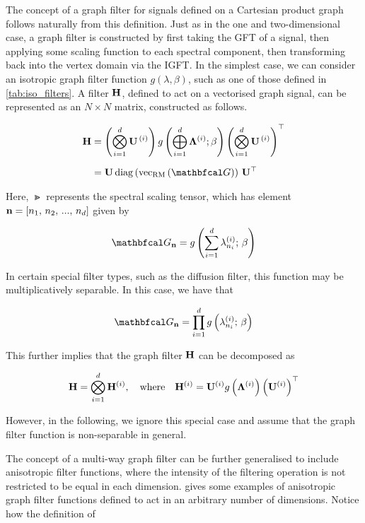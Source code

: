 The concept of a graph filter for signals defined on a Cartesian product graph follows naturally from this definition. Just as in the one and two-dimensional case, a graph filter is constructed by first taking the GFT of a signal, then applying some scaling function to each spectral component, then transforming back into the vertex domain via the IGFT. In the simplest case, we can consider an isotropic graph filter function $g(\lambda, \beta)$, such as one of those defined in \cref{tab:iso_filters}. A filter $\mathbf{H}$, defined to act on a vectorised graph signal, can be represented as an $N \times N$ matrix, constructed as follows. 


\begin{align}
    \label{eq:H_def_dd}
    \HH &= \left( \bigotimes_{i=1}^d  \U^{\,(i)} \right) g\left(\bigoplus_{i=1}^d \LAM^{(i)}; \beta \right) \left(\bigotimes_{i=1}^d  \U^{\,(i)} \right)^\top \notag \\[0.2cm]
        &= \U \, \diag{\vecrm{\Gt}} \, \U^\top
\end{align}


Here, $\Gt$ represents the spectral scaling tensor, which has element $\mathbf{n} = [n_1,\, n_2,\, ...,\, n_d]$ given by 

\begin{equation}
    \label{eq:Gn_dd1}
    \Gt_{\nn} = g\left(\sum_{i=1}^d \lambda^{(i)}_{n_i}; \, \beta\right)
\end{equation}

In certain special filter types, such as the diffusion filter, this function may be multiplicatively separable. In this case, we have that 

\begin{equation}
    \Gt_{\nn} = \prod_{i=1}^d g\left(\lambda^{(i)}_{n_i}; \, \beta\right)
\end{equation}

This further implies that the graph filter $\mathbf{H}$ can be decomposed as 

\begin{equation}
    \mathbf{H} = \bigotimes_{i=1}^d \mathbf{H}^{(i)}, \quad \text{where} \quad \mathbf{H}^{(i)} = \mathbf{U}^{(i)} g\left(\mathbf{\Lambda}^{(i)}\right) \left(\mathbf{U}^{(i)}\right)^\top
\end{equation}

However, in the following, we ignore this special case and assume that the graph filter function is non-separable in general. 

The concept of a multi-way graph filter can be further generalised to include anisotropic filter functions, where the intensity of the filtering operation is not restricted to be equal in each dimension.  gives some examples of anisotropic graph filter functions defined to act in an arbitrary number of dimensions. Notice how the definition of  

